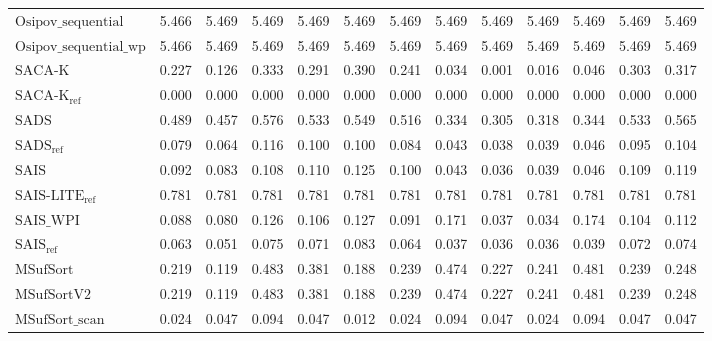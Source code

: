 \begin{table}[h]
{\begin{tabular}{lrrrrrrrrrrrr}
    $\text{Osipov\_sequential}$ & {\color{red}5.466} & {\color{red}5.469} & {\color{red}5.469} & {\color{red}5.469} & {\color{red}5.469} & {\color{red}5.469} & {\color{red}5.469} & {\color{red}5.469} & {\color{red}5.469} & {\color{red}5.469} & {\color{red}5.469} & {\color{red}5.469} \\
    $\text{Osipov\_sequential\_wp}$ & {\color{red}5.466} & {\color{red}5.469} & {\color{red}5.469} & {\color{red}5.469} & {\color{red}5.469} & {\color{red}5.469} & {\color{red}5.469} & {\color{red}5.469} & {\color{red}5.469} & {\color{red}5.469} & {\color{red}5.469} & {\color{red}5.469} \\
    $\text{SACA-K}$ & 0.227 & 0.126 & 0.333 & 0.291 & 0.390 & 0.241 & 0.034 & 0.001 & 0.016 & 0.046 & 0.303 & 0.317 \\
    $\text{SACA-K}_{\text{ref}}$ & {\color{green!60!black}0.000} & {\color{green!60!black}0.000} & {\color{green!60!black}0.000} & {\color{green!60!black}0.000} & {\color{green!60!black}0.000} & {\color{green!60!black}0.000} & {\color{green!60!black}0.000} & {\color{green!60!black}0.000} & {\color{green!60!black}0.000} & {\color{green!60!black}0.000} & {\color{green!60!black}0.000} & {\color{green!60!black}0.000} \\
    $\text{SADS}$ & 0.489 & 0.457 & 0.576 & 0.533 & 0.549 & 0.516 & 0.334 & 0.305 & 0.318 & 0.344 & 0.533 & 0.565 \\
    $\text{SADS}_{\text{ref}}$ & 0.079 & 0.064 & 0.116 & 0.100 & 0.100 & 0.084 & 0.043 & 0.038 & 0.039 & 0.046 & 0.095 & 0.104 \\
    $\text{SAIS}$ & 0.092 & 0.083 & 0.108 & 0.110 & 0.125 & 0.100 & 0.043 & 0.036 & 0.039 & 0.046 & 0.109 & 0.119 \\
    $\text{SAIS-LITE}_{\text{ref}}$ & 0.781 & 0.781 & 0.781 & 0.781 & 0.781 & 0.781 & 0.781 & 0.781 & 0.781 & 0.781 & 0.781 & 0.781 \\
    $\text{SAIS\_WPI}$ & 0.088 & 0.080 & 0.126 & 0.106 & 0.127 & 0.091 & 0.171 & 0.037 & 0.034 & 0.174 & 0.104 & 0.112 \\
    $\text{SAIS}_{\text{ref}}$ & 0.063 & 0.051 & 0.075 & 0.071 & 0.083 & 0.064 & 0.037 & 0.036 & 0.036 & 0.039 & 0.072 & 0.074 \\
    $\text{MSufSort}$ & 0.219 & 0.119 & 0.483 & 0.381 & 0.188 & 0.239 & 0.474 & 0.227 & 0.241 & 0.481 & 0.239 & 0.248 \\
    $\text{MSufSortV2}$ & 0.219 & 0.119 & 0.483 & 0.381 & 0.188 & 0.239 & 0.474 & 0.227 & 0.241 & 0.481 & 0.239 & 0.248 \\
    $\text{MSufSort\_scan}$ & 0.024 & 0.047 & 0.094 & 0.047 & 0.012 & 0.024 & 0.094 & 0.047 & 0.024 & 0.094 & 0.047 & 0.047 \\

\end{tabular}}
\end{table}
